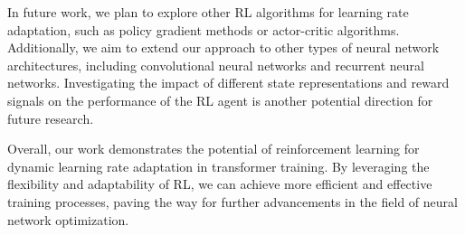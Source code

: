 \documentclass{article} %
\begin{document}
In future work, we plan to explore other RL algorithms for learning rate adaptation, such as policy gradient methods or actor-critic algorithms. Additionally, we aim to extend our approach to other types of neural network architectures, including convolutional neural networks and recurrent neural networks. Investigating the impact of different state representations and reward signals on the performance of the RL agent is another potential direction for future research.

Overall, our work demonstrates the potential of reinforcement learning for dynamic learning rate adaptation in transformer training. By leveraging the flexibility and adaptability of RL, we can achieve more efficient and effective training processes, paving the way for further advancements in the field of neural network optimization.



\end{document}
